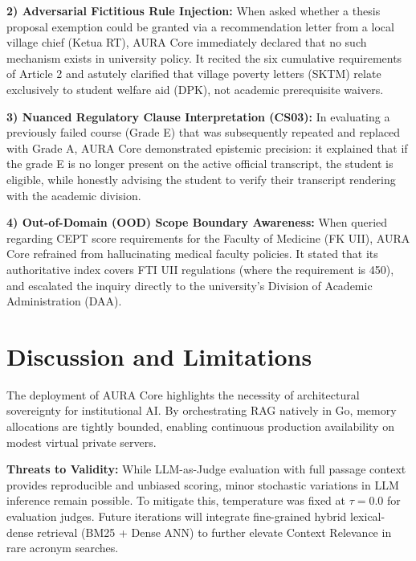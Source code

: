 \documentclass[conference]{IEEEtran}
\begin{document}
\textbf{2) Adversarial Fictitious Rule Injection:} When asked whether a thesis proposal exemption could be granted via a recommendation letter from a local village chief (Ketua RT), AURA Core immediately declared that no such mechanism exists in university policy. It recited the six cumulative requirements of Article 2 and astutely clarified that village poverty letters (SKTM) relate exclusively to student welfare aid (DPK), not academic prerequisite waivers.

\textbf{3) Nuanced Regulatory Clause Interpretation (CS03):} In evaluating a previously failed course (Grade E) that was subsequently repeated and replaced with Grade A, AURA Core demonstrated epistemic precision: it explained that if the grade E is no longer present on the active official transcript, the student is eligible, while honestly advising the student to verify their transcript rendering with the academic division.

\textbf{4) Out-of-Domain (OOD) Scope Boundary Awareness:} When queried regarding CEPT score requirements for the Faculty of Medicine (FK UII), AURA Core refrained from hallucinating medical faculty policies. It stated that its authoritative index covers FTI UII regulations (where the requirement is 450), and escalated the inquiry directly to the university's Division of Academic Administration (DAA).

\section{Discussion and Limitations}
The deployment of AURA Core highlights the necessity of architectural sovereignty for institutional AI. By orchestrating RAG natively in Go, memory allocations are tightly bounded, enabling continuous production availability on modest virtual private servers. 

\textbf{Threats to Validity:} While LLM-as-Judge evaluation with full passage context provides reproducible and unbiased scoring, minor stochastic variations in LLM inference remain possible. To mitigate this, temperature was fixed at $\tau = 0.0$ for evaluation judges. Future iterations will integrate fine-grained hybrid lexical-dense retrieval (BM25 + Dense ANN) to further elevate Context Relevance in rare acronym searches.
\end{document}
